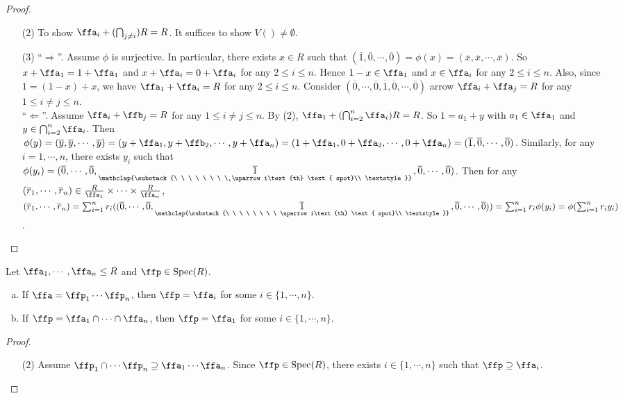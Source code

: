 \begin{proof}
    \begin{enumerate}
        \item [(2)]
            To show $\ffa_i + (\bigcap_{j \neq i})R = R$. It suffices to show $V() \neq \emptyset$.
        \item [(3)]
            ``$\Rightarrow$''. Assume $\phi$ is surjective. In particular, there exists $x \in R$ such that $(\overline 1,\overline 0,\cdots,\overline 0) = \phi(x) = (\overline x, \overline x, \cdots, \overline x)$. So $x+\ffa_1 = 1+\ffa_1$ and $x+\ffa_i = 0 + \ffa_i$ for any $2 \leq i \leq n$. Hence $1-x \in \ffa_1$ and $x \in \ffa_i$ for any $2 \leq i \leq n$. Also, since $1 = (1-x) + x$, we have $\ffa_1 + \ffa_i = R$ for any $2 \leq i \leq n$. Consider $(\overline 0, \cdots, \overline 0, \overline 1, \overline 0, \cdots, \overline 0)$ arrow $\ffa_i + \ffa_j = R$ for any $1 \leq i \neq j \leq n$. \\
            ``$\Leftarrow$''. Assume $\ffa_i + \ffb_j = R$ for any $1 \leq i \neq j \leq n$. By (2), $\ffa_1 + (\bigcap_{i=2}^n \ffa_i)R = R$. So $1 = a_1 + y$ with $a_1 \in \ffa_1$ and $y \in \bigcap_{i=2}^n \ffa_i$. Then $\phi(y) = (\overline y, \overline y, \cdots, \overline y) = (y + \ffa_1, y + \ffb_2, \cdots, y + \ffa_n) = (1+\ffa_1,0+\ffa_2,\cdots,0+\ffa_n) = (\overline 1,\overline 0, \cdots, \overline 0)$. Similarly, for any $i = 1,\cdots,n$, there exists $y_i$ such that $\phi(y_i) = (\overline 0, \cdots, \overline 0, \mathpunct{\underset{\mathclap{\substack{\ \ \ \ \ \ \ \ \uparrow i\text{th} \text{ spot}\\ \textstyle }}}{\overline 1}}, \overline 0, \cdots, \overline 0)$. Then for any $(\overline r_1,\cdots, \overline r_n) \in \frac{R}{\ffa_1} \times \cdots \times \frac{R}{\ffa_n}$, $(\overline r_1,\cdots, \overline r_n) = \sum_{i=1}^n r_i((\overline 0, \cdots, \overline 0, \mathpunct{\underset{\mathclap{\substack{\ \ \ \ \ \ \ \ \uparrow i\text{th} \text{ spot}\\ \textstyle }}}{\overline 1}}, \overline 0, \cdots, \overline 0)) = \sum_{i=1}^n r_i\phi(y_i) = \phi(\sum_{i=1}^nr_iy_i)$.
    \end{enumerate}
\end{proof}


\begin{proposition}
    Let $\ffa_1,\cdots,\ffa_n \leq R$ and $\ffp \in \operatorname{Spec}(R)$.
    \begin{enumerate}[(a)]
        \item If $\ffa = \ffp_1 \cdots \ffp_n$, then $\ffp = \ffa_i$ for some $i \in \{1,\cdots,n\}$.
        \item If $\ffp = \ffa_1 \cap \cdots \cap \ffa_n$, then $\ffp = \ffa_1$ for some $i \in \{1,\cdots,n\}$.
    \end{enumerate}
\end{proposition}

\begin{proof}
    \begin{enumerate}
        \item [(2)] Assume $\ffp_1 \cap \cdots \ffp_n \supseteq \ffa_1 \cdots \ffa_n$. Since $\ffp \in \operatorname{Spec}(R)$, there exists $i \in \{1,\cdots,n\}$ such that $\ffp \supseteq \ffa_i$.
    \end{enumerate}
\end{proof}

\begin{fact}
\end{fact}

